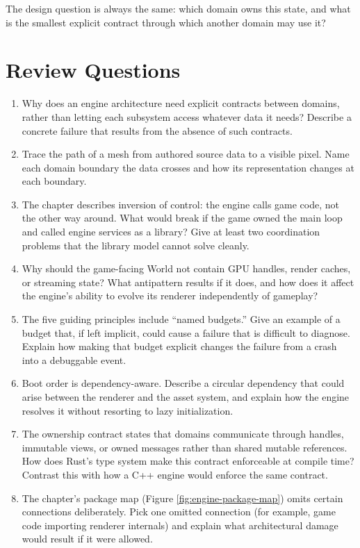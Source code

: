 \documentclass[
  11pt,
  letterpaper,
  DIV=11,
  numbers=noendperiod,
  twoside,
  open=right]{scrreprt}
\begin{document}
The design question is always the same: which domain owns this state,
and what is the smallest explicit contract through which another domain
may use it?

\section*{Review Questions}\label{review-questions-1}


\begin{enumerate}
\def\labelenumi{\arabic{enumi}.}
\item
  Why does an engine architecture need explicit contracts between
  domains, rather than letting each subsystem access whatever data it
  needs? Describe a concrete failure that results from the absence of
  such contracts.
\item
  Trace the path of a mesh from authored source data to a visible pixel.
  Name each domain boundary the data crosses and how its representation
  changes at each boundary.
\item
  The chapter describes inversion of control: the engine calls game
  code, not the other way around. What would break if the game owned the
  main loop and called engine services as a library? Give at least two
  coordination problems that the library model cannot solve cleanly.
\item
  Why should the game-facing World not contain GPU handles, render
  caches, or streaming state? What antipattern results if it does, and
  how does it affect the engine's ability to evolve its renderer
  independently of gameplay?
\item
  The five guiding principles include ``named budgets.'' Give an example
  of a budget that, if left implicit, could cause a failure that is
  difficult to diagnose. Explain how making that budget explicit changes
  the failure from a crash into a debuggable event.
\item
  Boot order is dependency-aware. Describe a circular dependency that
  could arise between the renderer and the asset system, and explain how
  the engine resolves it without resorting to lazy initialization.
\item
  The ownership contract states that domains communicate through
  handles, immutable views, or owned messages rather than shared mutable
  references. How does Rust's type system make this contract enforceable
  at compile time? Contrast this with how a C++ engine would enforce the
  same contract.
\item
  The chapter's package map (Figure \ref{fig:engine-package-map}) omits
  certain connections deliberately. Pick one omitted connection (for
  example, game code importing renderer internals) and explain what
  architectural damage would result if it were allowed.
\end{enumerate}
\end{document}
